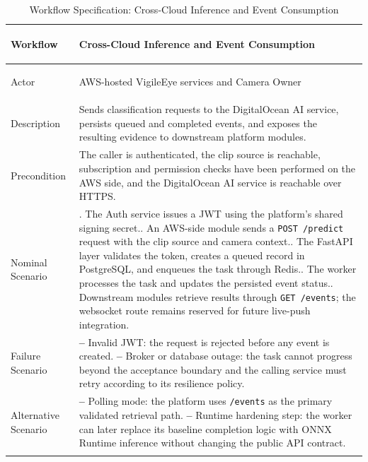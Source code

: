 \documentclass[12pt,a4paper,oneside]{report}
\newlength{\TblTwoKeyW}
\newlength{\TblTwoValW}
\begin{document}
{\small
\begin{longtable}{|>{\bfseries\raggedright\arraybackslash}p{\TblTwoKeyW}|>{\raggedright\arraybackslash}p{\TblTwoValW}|}
\hline
Workflow    & Cross-Cloud Inference and Event Consumption \\ \hline
Actor       & AWS-hosted VigileEye services and Camera Owner \\ \hline
Description & Sends classification requests to the DigitalOcean AI service, persists queued and completed events, and exposes the resulting evidence to downstream platform modules. \\ \hline
Precondition & The caller is authenticated, the clip source is reachable, subscription and permission checks have been performed on the AWS side, and the DigitalOcean AI service is reachable over HTTPS. \\ \hline
Nominal Scenario &
1. The Auth service issues a JWT using the platform's shared signing secret.\newline
2. An AWS-side module sends a \texttt{POST /predict} request with the clip source and camera context.\newline
3. The FastAPI layer validates the token, creates a queued record in PostgreSQL, and enqueues the task through Redis.\newline
4. The worker processes the task and updates the persisted event status.\newline
5. Downstream modules retrieve results through \texttt{GET /events}; the websocket route remains reserved for future live-push integration. \\ \hline
Failure Scenario &
\textbf{--} Invalid JWT: the request is rejected before any event is created.\newline
\textbf{--} Broker or database outage: the task cannot progress beyond the acceptance boundary and the calling service must retry according to its resilience policy. \\ \hline
Alternative Scenario &
\textbf{--} Polling mode: the platform uses \texttt{/events} as the primary validated retrieval path.\newline
\textbf{--} Runtime hardening step: the worker can later replace its baseline completion logic with ONNX Runtime inference without changing the public API contract. \\ \hline
\caption{Workflow Specification: Cross-Cloud Inference and Event Consumption}
\label{tab:app_s4_workflow_runtime}
\end{longtable}
}
\end{document}
